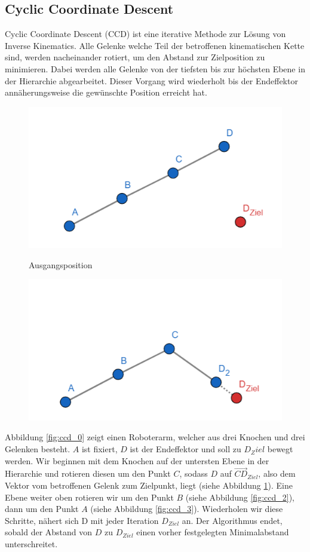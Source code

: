 \subsection{Cyclic Coordinate Descent}
Cyclic Coordinate Descent (CCD) ist eine iterative Methode zur Lösung von Inverse Kinematics. Alle Gelenke welche Teil der betroffenen kinematischen Kette sind, werden nacheinander rotiert, um den Abstand zur Zielposition zu minimieren. Dabei werden alle Gelenke von der tiefsten bis zur höchsten Ebene in der Hierarchie abgearbeitet. Dieser Vorgang wird wiederholt bis der Endeffektor annäherungsweise die gewünschte Position erreicht hat.
\newline\newline
\begin{figure}[!htb]
	\includegraphics[width=\linewidth]{geogebra/ccd_0.png}
	\caption{Ausgangsposition}\label{fig:ccd_0}
	\endminipage\hfill
	\includegraphics[width=\linewidth]{geogebra/ccd_1.png}
	\caption{}\label{fig:ccd_1}
	\endminipage\hfill
\end{figure} 
Abbildung \ref{fig:ccd_0} zeigt einen Roboterarm, welcher aus drei Knochen und drei Gelenken besteht. $A$ ist fixiert, $D$ ist der Endeffektor und soll zu $D_Ziel$ bewegt werden. Wir beginnen mit dem Knochen auf der untersten Ebene in der Hierarchie und rotieren diesen um den Punkt $C$, sodass $D$ auf $\vec{CD}_{Ziel}$, also dem Vektor vom betroffenen Gelenk zum Zielpunkt, liegt (siehe Abbildung \ref{fig:ccd_1}). Eine Ebene weiter oben rotieren wir um den Punkt $B$ (siehe Abbildung \ref{fig:ccd_2}), dann um den Punkt $A$ (siehe Abbildung \ref{fig:ccd_3}). Wiederholen wir diese Schritte, nähert sich D mit jeder Iteration $D_{Ziel}$ an. Der Algorithmus endet, sobald der Abstand von $D$ zu $D_{Ziel}$ einen vorher festgelegten Minimalabstand unterschreitet.
